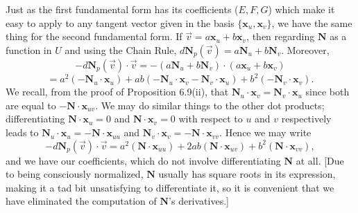 \documentclass[leqno]{book}
\begin{document}
\noindent Just as the first fundamental form has its coefficients ($E,F,G$) which make it easy to apply to any tangent vector given in the basis $\{\mathbf x_u,\mathbf x_v\}$, we have the same thing for the second fundamental form.  If $\vec v=a\mathbf x_u+b\mathbf x_v$, then regarding $\mathbf N$ as a function in $U$ and using the Chain Rule, $d\mathbf N_p(\vec v)=a\mathbf N_u+b\mathbf N_v$.  Moreover,
$$-d\mathbf N_p(\vec v)\cdot\vec v=-(a\mathbf N_u+b\mathbf N_v)\cdot(a\mathbf x_u+b\mathbf x_v)$$
$$=a^2(-\mathbf N_u\cdot\mathbf x_u)+ab(-\mathbf N_u\cdot\mathbf x_v-\mathbf N_v\cdot\mathbf x_u)+b^2(-\mathbf N_v\cdot\mathbf x_v).$$
We recall, from the proof of Proposition 6.9(ii), that $\mathbf N_u\cdot\mathbf x_v=\mathbf N_v\cdot\mathbf x_u$ since both are equal to $-\mathbf N\cdot\mathbf x_{uv}$.  We may do similar things to the other dot products; differentiating $\mathbf N\cdot\mathbf x_u=0$ and $\mathbf N\cdot\mathbf x_v=0$ with respect to $u$ and $v$ respectively leads to $\mathbf N_u\cdot\mathbf x_u=-\mathbf N\cdot\mathbf x_{uu}$ and $\mathbf N_v\cdot\mathbf x_v=-\mathbf N\cdot\mathbf x_{vv}$.  Hence we may write
$$-d\mathbf N_p(\vec v)\cdot\vec v=a^2(\mathbf N\cdot\mathbf x_{uu})+2ab(\mathbf N\cdot\mathbf x_{uv})+b^2(\mathbf N\cdot\mathbf x_{vv}),$$
and we have our coefficients, which do not involve differentiating $\mathbf N$ at all.  [Due to being consciously normalized, $\mathbf N$ usually has square roots in its expression, making it a tad bit unsatisfying to differentiate it, so it is convenient that we have eliminated the computation of $\mathbf N$'s derivatives.]\\ %
\end{document}
